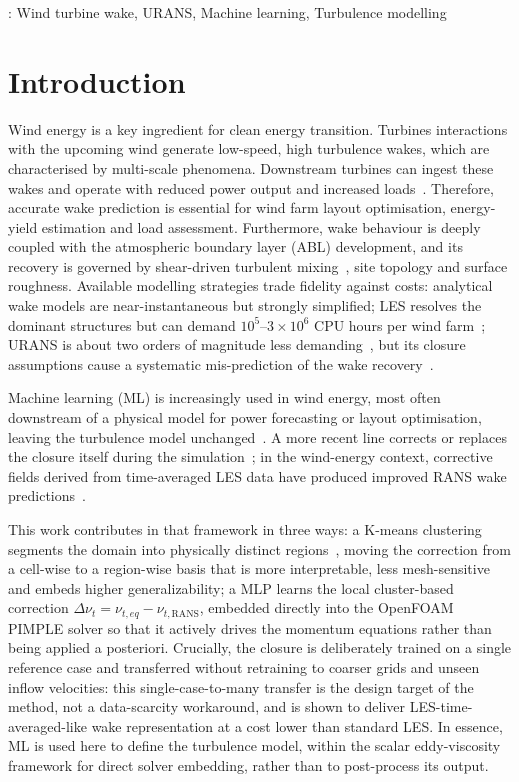 \documentclass[12pt,a4paper]{article}
\newcommand{\keywords}[1]{\par\noindent{\itshape Keywords}: #1\par\vspace{6pt}}
\begin{document}
\keywords{Wind turbine wake, URANS, Machine learning, Turbulence modelling}

\section{Introduction}
\label{sec:introduction}
Wind energy is a key ingredient for clean energy transition.
Turbines interactions with the upcoming wind generate
low-speed, high turbulence wakes, which are characterised by multi-scale phenomena. 
Downstream turbines can ingest these wakes and operate with
reduced power output and increased loads~\cite{Porte-Agel2020}. Therefore, accurate 
wake prediction is essential for wind farm layout optimisation, energy-yield estimation 
and load assessment. Furthermore, wake behaviour is deeply coupled with the atmospheric 
boundary layer (ABL) development, and its recovery is governed by shear-driven turbulent 
mixing~\cite{Porte-Agel2020}, site topology and surface roughness. Available modelling
strategies trade fidelity against costs: analytical wake models are near-instantaneous but
strongly simplified; LES resolves the dominant structures but can demand
$10^5$--$3\times10^6$ CPU hours per wind farm~\cite{Steiner2021}; URANS is about two
orders of magnitude less demanding~\cite{Steiner2021}, but its closure assumptions cause a
systematic mis-prediction of the wake recovery~\cite{72116acdc5aa4b3b8fc752f1b2fa9958}.

Machine learning (ML) is increasingly used in wind energy, most often downstream of a
physical model for power forecasting or layout optimisation, leaving the turbulence model
unchanged~\cite{GholamiAnjiraki2025}. A more recent line corrects or replaces the closure
itself during the simulation~\cite{Duraisamy2019,Ling2016}; in the wind-energy context,
corrective fields derived from time-averaged LES data have produced improved RANS wake
predictions~\cite{Steiner2021,King_2018}.

This work contributes in that framework in three ways: a K-means clustering segments the
domain into physically distinct regions~\cite{Clustering_tieghi,Carloni2026}, moving the
correction from a cell-wise to a region-wise basis that is more interpretable, less
mesh-sensitive and embeds higher generalizability; a MLP learns the local cluster-based
correction $\Delta\nu_t = \nu_{t,eq} - \nu_{t,\mathrm{RANS}}$, embedded directly into the
OpenFOAM PIMPLE solver so that it actively drives the momentum equations rather than being
applied a posteriori.
Crucially, the closure is deliberately trained on a single reference case and transferred
without retraining to coarser grids and unseen inflow velocities: this single-case-to-many
transfer is the design target of the method, not a data-scarcity workaround, and is shown
to deliver LES-time-averaged-like wake representation at a cost lower than standard LES.
In essence, ML is used here to define the turbulence model, within the scalar
eddy-viscosity framework for direct solver embedding, rather than to post-process its
output.
\end{document}
